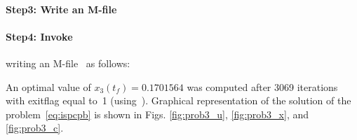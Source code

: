 {\small }

\paragraph{Step3: Write an M-file~}

{\small }

\paragraph{Step4: Invoke~} writing an
M-file~ as follows: 

{\small }

An optimal value of $x_{3}(t_{f})=0.1701564$ was computed after 3069
iterations with exitflag equal to~1 (using~). Graphical
representation of the solution of the problem~\eqref{eq:ispcpb} is
shown in Figs. \ref{fig:prob3_u}, \ref{fig:prob3_x}, and
\ref{fig:prob3_c}.

